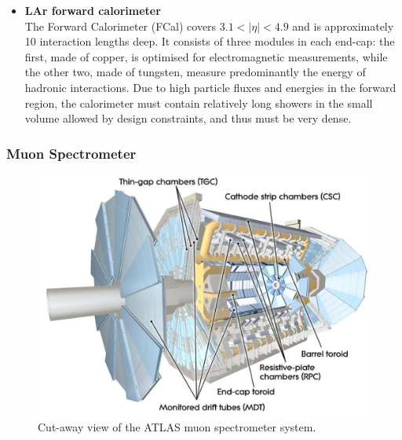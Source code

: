 \documentclass[letterpaper,12pt]{article}
\begin{document}
\begin{itemize}
		\item  \textbf{LAr forward calorimeter}\\
		The Forward Calorimeter (FCal) covers $3.1 < |\eta| < 4.9 $ and
		is approximately 10 interaction lengths deep. 
		It consists of three modules in each end-cap: 
		the first, made of copper, is optimised for	electromagnetic measurements, 
		while the other two, made of tungsten, measure predominantly the
		energy of hadronic interactions. 
		Due to high particle fluxes and
		energies in the forward region, the calorimeter must contain 
		relatively long showers in the small volume
		allowed by design constraints, and thus must be very dense.

	\end{itemize}

	\subsubsection{Muon Spectrometer}
	
	\begin{figure}[bht]
		\begin{centering}	
		\includegraphics[width=.6\textwidth]{Detector_plots/Muon.png}
		\caption{Cut-away view of the ATLAS muon spectrometer system.}
		\label{fig:MS}
		\end{centering}
	\end{figure}
	
\end{document}

